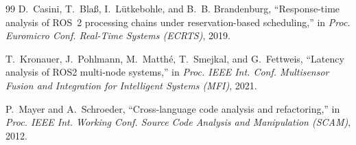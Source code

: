 \documentclass[conference]{IEEEtran}
\begin{document}
\begin{thebibliography}{99}
D.~Casini, T.~Bla{\ss}, I.~L{\"u}tkebohle, and B.~B. Brandenburg, ``Response-time analysis of {ROS}~2 processing chains under reservation-based scheduling,'' in \emph{Proc. Euromicro Conf. Real-Time Systems (ECRTS)}, 2019.

T.~Kronauer, J.~Pohlmann, M.~Matth{\'e}, T.~Smejkal, and G.~Fettweis, ``Latency analysis of {ROS2} multi-node systems,'' in \emph{Proc. IEEE Int. Conf. Multisensor Fusion and Integration for Intelligent Systems (MFI)}, 2021.

P.~Mayer and A.~Schroeder, ``Cross-language code analysis and refactoring,'' in \emph{Proc. IEEE Int. Working Conf. Source Code Analysis and Manipulation (SCAM)}, 2012.

\end{thebibliography}
\end{document}
